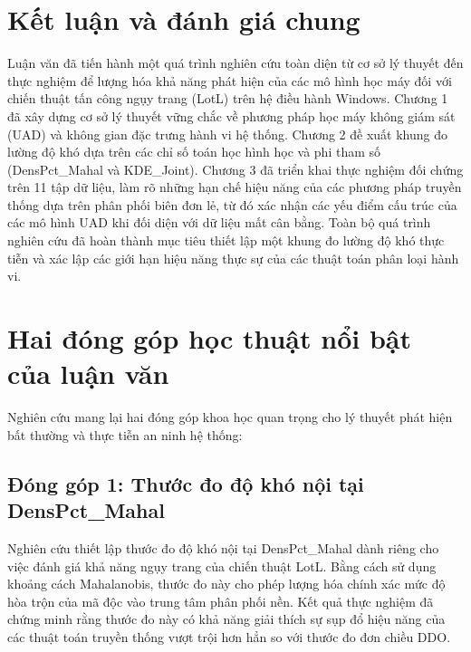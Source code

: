 \documentclass[../main.tex]{subfiles}
\begin{document}
\section*{Kết luận và đánh giá chung}
\label{section:5.1}

Luận văn đã tiến hành một quá trình nghiên cứu toàn diện từ cơ sở lý thuyết đến thực nghiệm để lượng hóa khả năng phát hiện của các mô hình học máy đối với chiến thuật tấn công ngụy trang (LotL) trên hệ điều hành Windows. Chương 1 đã xây dựng cơ sở lý thuyết vững chắc về phương pháp học máy không giám sát (UAD) và không gian đặc trưng hành vi hệ thống. Chương 2 đề xuất khung đo lường độ khó dựa trên các chỉ số toán học hình học và phi tham số (DensPct\_Mahal và KDE\_Joint). Chương 3 đã triển khai thực nghiệm đối chứng trên 11 tập dữ liệu, làm rõ những hạn chế hiệu năng của các phương pháp truyền thống dựa trên phân phối biên đơn lẻ, từ đó xác nhận các yếu điểm cấu trúc của các mô hình UAD khi đối diện với dữ liệu mất cân bằng. Toàn bộ quá trình nghiên cứu đã hoàn thành mục tiêu thiết lập một khung đo lường độ khó thực tiễn và xác lập các giới hạn hiệu năng thực sự của các thuật toán phân loại hành vi.

\section*{Hai đóng góp học thuật nổi bật của luận văn}
\label{section:5.2}

Nghiên cứu mang lại hai đóng góp khoa học quan trọng cho lý thuyết phát hiện bất thường và thực tiễn an ninh hệ thống:

\subsection*{Đóng góp 1: Thước đo độ khó nội tại DensPct\_Mahal}
Nghiên cứu thiết lập thước đo độ khó nội tại DensPct\_Mahal dành riêng cho việc đánh giá khả năng ngụy trang của chiến thuật LotL. Bằng cách sử dụng khoảng cách Mahalanobis, thước đo này cho phép lượng hóa chính xác mức độ hòa trộn của mã độc vào trung tâm phân phối nền. Kết quả thực nghiệm đã chứng minh rằng thước đo này có khả năng giải thích sự sụp đổ hiệu năng của các thuật toán truyền thống vượt trội hơn hẳn so với thước đo đơn chiều DDO.
\end{document}
